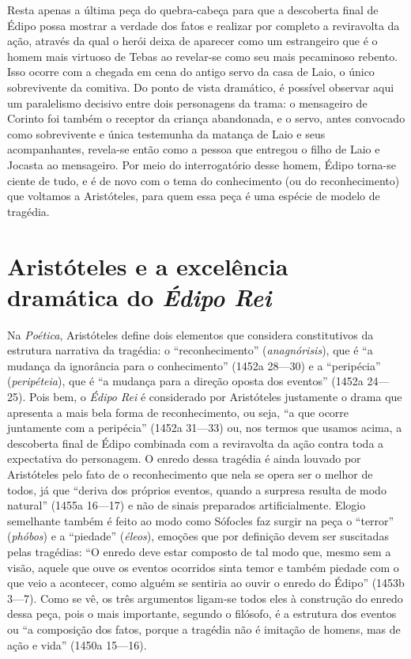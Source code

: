 Resta apenas a última peça do quebra-cabeça para que a descoberta final
de Édipo possa mostrar a verdade dos fatos e realizar por completo a
reviravolta da ação, através da qual o herói deixa de aparecer como um
estrangeiro que é o homem mais virtuoso de Tebas ao revelar-se como seu
mais pecaminoso rebento. Isso ocorre com a chegada em cena do antigo
servo da casa de Laio, o único sobrevivente da comitiva. Do ponto de
vista dramático, é possível observar aqui um paralelismo decisivo entre
dois personagens da trama: o mensageiro de Corinto foi também o receptor
da criança abandonada, e o servo, antes convocado como sobrevivente e
única testemunha da matança de Laio e seus acompanhantes, revela-se
então como a pessoa que entregou o filho de Laio e Jocasta ao
mensageiro. Por meio do interrogatório desse homem, Édipo torna-se
ciente de tudo, e é de novo com o tema do conhecimento (ou do
reconhecimento) que voltamos a Aristóteles, para quem essa peça é uma
espécie de modelo de tragédia.

\section{Aristóteles e a excelência dramática do \emph{Édipo Rei}}

Na \emph{Poética}, Aristóteles define dois elementos que considera
constitutivos da estrutura narrativa da tragédia: o ``reconhecimento''
(\emph{anagnórisis}), que é ``a mudança da ignorância para o
conhecimento'' (1452a 28---30) e a ``peripécia'' (\emph{peripéteia}), que
é ``a mudança para a direção oposta dos eventos'' (1452a 24---25). Pois
bem, o \emph{Édipo Rei} é considerado por Aristóteles justamente o drama
que apresenta a mais bela forma de reconhecimento, ou seja, ``a que
ocorre juntamente com a peripécia'' (1452a 31---33) ou, nos termos que
usamos acima, a descoberta final de Édipo combinada com a reviravolta da
ação contra toda a expectativa do personagem. O enredo dessa tragédia é
ainda louvado por Aristóteles pelo fato de o reconhecimento que nela se
opera ser o melhor de todos, já que ``deriva dos próprios eventos,
quando a surpresa resulta de modo natural'' (1455a 16---17) e não de
sinais preparados artificialmente. Elogio semelhante também é feito ao
modo como Sófocles faz surgir na peça o ``terror'' (\emph{phóbos}) e a
``piedade'' (\emph{éleos}), emoções que por definição devem ser
suscitadas pelas tragédias: ``O enredo deve estar composto de tal modo
que, mesmo sem a visão, aquele que ouve os eventos ocorridos sinta temor
e também piedade com o que veio a acontecer, como alguém se sentiria ao
ouvir o enredo do Édipo'' (1453b 3---7). Como se vê, os três argumentos
ligam-se todos eles à construção do enredo dessa peça, pois o mais
importante, segundo o filósofo, é a estrutura dos eventos ou ``a
composição dos fatos, porque a tragédia não é imitação de homens, mas de
ação e vida'' (1450a 15---16).

